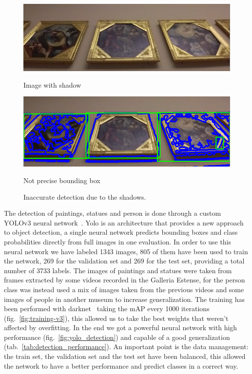 \begin{figure}[h]
      \includegraphics[width=\linewidth]{pictures/painting_detection/shadow1.PNG}
      \caption*{Image with shadow}\label{fig:shadow1}
    \endminipage\hfill
      \includegraphics[width=\linewidth]{pictures/painting_detection/shadow2.PNG}
      \caption*{Not precise bounding box}\label{fig:shadow2}
    \endminipage\hfill
    \caption{Inaccurate detection due to the shadows.}\label{fig:innaccurate_detection}
\end{figure}







The detection of paintings, statues and person is done through a custom YOLOv3 neural network~\cite{yolov3}.
Yolo is an architecture that provides a new approach to object detection, a single neural network predicts bounding boxes and class probabilities directly from full images in one evaluation.
In order to use this neural network we have labeled 1343 images, 805 of them have been used to train the network, 269 for the validation set and 269 for the test set, providing a total number of 3733 labels. The images of paintings and statues were taken from frames extracted by some videos recorded in the Galleria Estense, for the person class was instead used a mix of images taken from the previous videos and some images of people in another museum to increase generalization.
The training has been performed with darknet~\cite{darknet} taking the mAP every 1000 iterations (fig.~\ref{fig:training-v3}), this allowed us to take the best weights that weren't affected by overfitting.
In the end we got a powerful neural network with high performance (fig.~\ref{fig:yolo_detection}) and capable of a good generalization (tab.~\ref{tab:detection_performance}).
An important point is the data management: the train set, the validation set and the test set have been balanced, this allowed the network to have a better performance and predict classes in a correct way.



